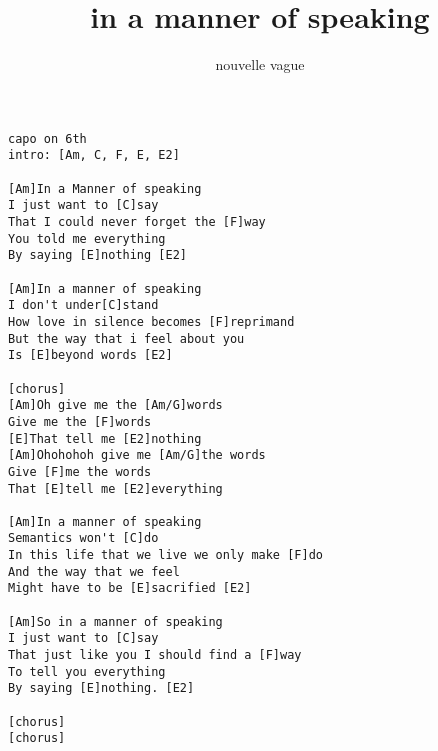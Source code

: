 \author{nouvelle vague}
\title{in a manner of speaking}
\maketitle
\begin{verbatim}
capo on 6th
intro: [Am, C, F, E, E2]

[Am]In a Manner of speaking
I just want to [C]say
That I could never forget the [F]way
You told me everything
By saying [E]nothing [E2]

[Am]In a manner of speaking
I don't under[C]stand
How love in silence becomes [F]reprimand
But the way that i feel about you
Is [E]beyond words [E2]

[chorus]
[Am]Oh give me the [Am/G]words
Give me the [F]words
[E]That tell me [E2]nothing
[Am]Ohohohoh give me [Am/G]the words
Give [F]me the words
That [E]tell me [E2]everything

[Am]In a manner of speaking
Semantics won't [C]do
In this life that we live we only make [F]do
And the way that we feel
Might have to be [E]sacrified [E2]

[Am]So in a manner of speaking
I just want to [C]say
That just like you I should find a [F]way
To tell you everything
By saying [E]nothing. [E2]

[chorus]
[chorus]
\end{verbatim}
